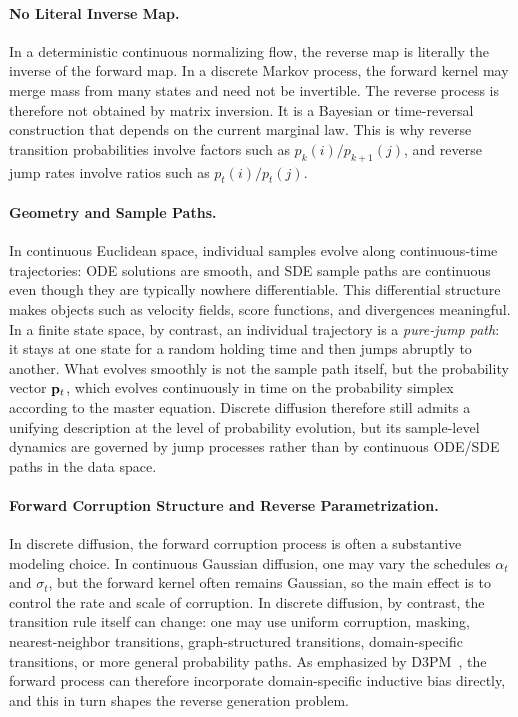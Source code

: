 \paragraph{No Literal Inverse Map.}
In a deterministic continuous normalizing flow, the reverse map is literally the inverse of the forward map. In a discrete Markov process, the forward kernel may merge mass from many states and need not be invertible. The reverse process is therefore not obtained by matrix inversion. It is a Bayesian or time-reversal construction that depends on the current marginal law. This is why reverse transition probabilities involve factors such as $p_k(i)/p_{k+1}(j)$, and reverse jump rates involve ratios such as $p_t(i)/p_t(j)$.

\paragraph{Geometry and Sample Paths.}
In continuous Euclidean space, individual samples evolve along
continuous-time trajectories: ODE solutions are smooth, and SDE sample
paths are continuous even though they are typically nowhere
differentiable. This differential structure makes objects such as
velocity fields, score functions, and divergences meaningful. In a
finite state space, by contrast, an individual trajectory is a
\emph{pure-jump path}: it stays at one state for a random holding time
and then jumps abruptly to another. What evolves smoothly is not the
sample path itself, but the probability vector ${\mathbf{p}}_t$, which evolves
continuously in time on the probability simplex according to the master
equation. Discrete diffusion therefore still admits a unifying
description at the level of probability evolution, but its sample-level
dynamics are governed by jump processes rather than by continuous ODE/SDE
paths in the data space.

\paragraph{Forward Corruption Structure and Reverse Parametrization.}
In discrete diffusion, the forward corruption process is often a substantive modeling choice. In continuous Gaussian diffusion, one may vary the schedules $\alpha_t$ and $\sigma_t$, but the forward kernel often remains Gaussian, so the main effect is to control the rate and scale of corruption. In discrete diffusion, by contrast, the transition rule itself can change: one may use uniform corruption, masking, nearest-neighbor transitions, graph-structured transitions, domain-specific transitions, or more general probability paths. As emphasized by D3PM~\citep{austin2021structured}, the forward process can therefore incorporate domain-specific inductive bias directly, and this in turn shapes the reverse generation problem.

